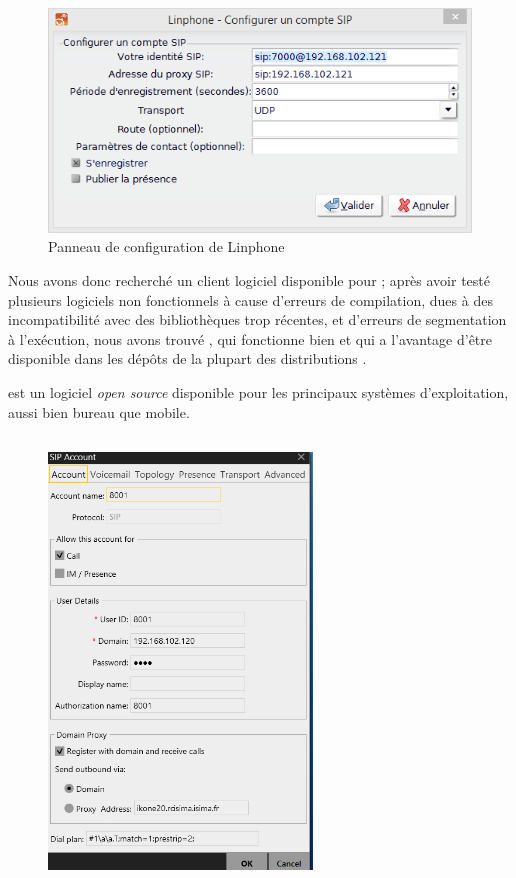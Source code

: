 \begin{figure}[h]
\begin{center}
\includegraphics[width=12cm]{images/config-linphone.png}
\end{center}
\caption{Panneau de configuration de Linphone}
\end{figure}

Nous avons donc recherché un client logiciel disponible pour {\lnx} ; après avoir testé plusieurs logiciels non fonctionnels à cause d’erreurs de compilation, dues à des incompatibilité avec des bibliothèques trop récentes, et d’erreurs de segmentation à l’exécution, nous avons trouvé {\lnp}, qui fonctionne bien et qui a l’avantage d’être disponible dans les dépôts de la plupart des distributions {\lnx}.


{\lnp} est un logiciel \textit{open source} disponible pour les principaux systèmes d’exploitation, aussi bien bureau que mobile.


\subsection{\cph}

\begin{figure}[h]
\begin{center}
\includegraphics[width=7cm]{images/config-xlite.png}
\end{center}
\caption{\cph}
\end{figure}

